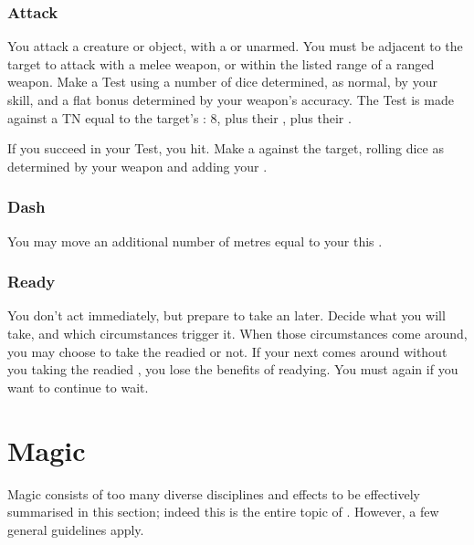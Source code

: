 \subsubsection{Attack}

You attack a creature or object, with a  or unarmed.
You must be adjacent to the target to attack with a melee weapon, or within the listed range of a ranged weapon.
Make a Test using a number of dice determined, as normal, by your  skill, and a flat bonus determined by your weapon's accuracy.
The Test is made against a TN equal to the target's : 8, plus their , plus their .

If you succeed in your Test, you hit.
Make a {\damagetest} against the target, rolling dice as determined by your weapon and adding your .

\subsubsection{Dash}

You may move an additional number of metres equal to your  this {\turn}.

\subsubsection{Ready}

You don't act immediately, but prepare to take an {\action} later.
Decide what {\action} you will take, and which circumstances trigger it.
When those circumstances come around, you may choose to take the readied {\action} or not.
If your next {\turn} comes around without you taking the readied {\action}, you lose the benefits of readying.
You must  again if you want to continue to wait.

\section{Magic}

Magic consists of too many diverse disciplines and effects to be effectively summarised in this section; indeed this is the entire topic of .
However, a few general guidelines apply.

